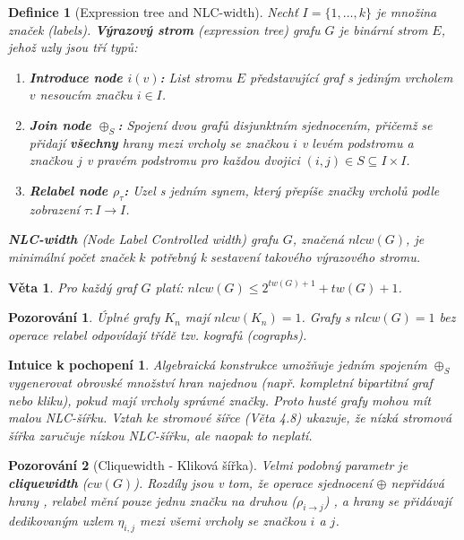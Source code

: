 \documentclass[a4paper,11pt]{article}
\newtheorem{definition}{Definice}[section]
\newtheorem{theorem}{Věta}[section]
\newtheorem{observation}{Pozorování}[section]
\newtheorem*{intuition}{Intuice k pochopení}
\begin{document}
\begin{definition}[Expression tree and NLC-width]
Nechť $I = \{1, \dots, k\}$ je množina značek (labels). \textbf{Výrazový strom} (expression tree) grafu $G$ je binární strom $E$, jehož uzly jsou tří typů:
\begin{enumerate}
    \item \textbf{Introduce node $i(v)$:} List stromu $E$ představující graf s jediným vrcholem $v$ nesoucím značku $i \in I$.
    \item \textbf{Join node $\oplus_S$:} Spojení dvou grafů disjunktním sjednocením, přičemž se přidají \textbf{všechny} hrany mezi vrcholy se značkou $i$ v levém podstromu a značkou $j$ v pravém podstromu pro každou dvojici $(i,j) \in S \subseteq I \times I$.
    \item \textbf{Relabel node $\rho_\tau$:} Uzel s jedním synem, který přepíše značky vrcholů podle zobrazení $\tau: I \to I$.
\end{enumerate}
\textbf{NLC-width} (Node Label Controlled width) grafu $G$, značená $nlcw(G)$, je minimální počet značek $k$ potřebný k sestavení takového výrazového stromu.
\end{definition}

\begin{theorem}
Pro každý graf $G$ platí: $nlcw(G) \le 2^{tw(G)+1} + tw(G) + 1$.
\end{theorem}

\begin{observation}
Úplné grafy $K_n$ mají $nlcw(K_n) = 1$. Grafy s $nlcw(G) = 1$ bez operace relabel odpovídají třídě tzv. kografů (cographs).
\end{observation}

\begin{intuition}
Algebraická konstrukce umožňuje jedním spojením $\oplus_S$ vygenerovat obrovské množství hran najednou (např. kompletní bipartitní graf nebo kliku), pokud mají vrcholy správné značky. Proto husté grafy mohou mít malou NLC-šířku. Vztah ke stromové šířce (Věta 4.8) ukazuje, že nízká stromová šířka zaručuje nízkou NLC-šířku, ale naopak to neplatí.
\end{intuition}

\begin{observation}[Cliquewidth - Kliková šířka]
Velmi podobný parametr je \textbf{cliquewidth} ($cw(G)$). Rozdíly jsou v tom, že operace sjednocení $\oplus$ nepřidává hrany , relabel mění pouze jednu značku na druhou ($\rho_{i \to j}$) , a hrany se přidávají dedikovaným uzlem $\eta_{i,j}$ mezi všemi vrcholy se značkou $i$ a $j$.
\end{observation}
\end{document}
